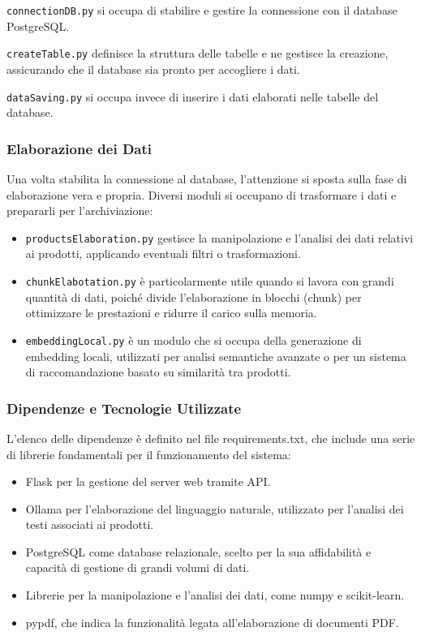 \texttt{connectionDB.py} si occupa di stabilire e gestire la connessione con il database PostgreSQL.

\texttt{createTable.py} definisce la struttura delle tabelle e ne gestisce la creazione, assicurando che il database sia pronto per accogliere i dati.

\texttt{dataSaving.py} si occupa invece di inserire i dati elaborati nelle tabelle del database.

\subsubsection{Elaborazione dei Dati}
Una volta stabilita la connessione al database, l'attenzione si sposta sulla fase di elaborazione vera e propria. Diversi moduli si occupano di trasformare i dati e prepararli per l'archiviazione:

\begin{itemize}
 

\item \texttt{productsElaboration.py} gestisce la manipolazione e l'analisi dei dati relativi ai prodotti, applicando eventuali filtri o trasformazioni.

\item \texttt{chunkElabotation.py} è particolarmente utile quando si lavora con grandi quantità di dati, poiché divide l'elaborazione in blocchi (chunk) per ottimizzare le prestazioni e ridurre il carico sulla memoria.

\item \texttt{embeddingLocal.py} è un modulo che si occupa della generazione di embedding locali,  utilizzati per analisi semantiche avanzate o per un sistema di raccomandazione basato su similarità tra prodotti.

\end{itemize}
\subsubsection{ Dipendenze e Tecnologie Utilizzate}
L’elenco delle dipendenze è definito nel file requirements.txt, che include una serie di librerie fondamentali per il funzionamento del sistema:

\begin{itemize}
    
\item Flask per la gestione del server web tramite API.

\item Ollama per l’elaborazione del linguaggio naturale,  utilizzato per l'analisi dei testi associati ai prodotti.

\item PostgreSQL come database relazionale, scelto per la sua affidabilità e capacità di gestione di grandi volumi di dati.

\item Librerie per la manipolazione e l'analisi dei dati, come numpy e scikit-learn.

\item pypdf, che indica la funzionalità legata all'elaborazione di documenti PDF.

\end{itemize}